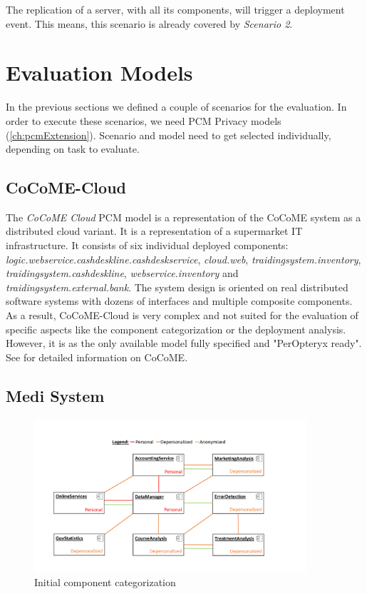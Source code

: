 The replication of a server, with all its components, will trigger a deployment event. This means, this scenario is already covered by \textit{Scenario 2}.


\section{Evaluation Models}
\label{sec:Evaluation:models}

In the previous sections we defined a couple of scenarios for the evaluation. In order to execute these scenarios, we need PCM Privacy models (\autoref{ch:pcmExtension}). Scenario and model need to get selected individually, depending on task to evaluate.

\subsection{CoCoME-Cloud}
\label{sec:eval:models:cocome}

The \textit{CoCoME Cloud} PCM model is a representation of the CoCoME system as a distributed cloud variant. It is a representation of a supermarket IT infrastructure. It consists of six individual deployed components:  \textit{logic.webservice.cashdeskline.cashdeskservice}, \textit{cloud.web}, \textit{traidingsystem.inventory}, \textit{traidingsystem.cashdeskline}, \textit{webservice.inventory} and \textit{traidingsystem.external.bank}. The system design is oriented on real distributed software systems with dozens of interfaces and multiple composite components. As a result, CoCoME-Cloud is very complex and not suited for the evaluation of specific aspects like the component categorization or the deployment analysis. However, it is as the only available model fully specified and "PerOpteryx ready". See \cite{Heinrich.2015} for detailed information on CoCoME.


\subsection{Medi System}
\label{sec:eval:models:medSys}

\begin{figure}[h]
	\centering
	\includegraphics[trim = 0mm 10mm 0mm 20mm, clip, width=0.90\textwidth]{graphs/medSystem_noserver}
	\caption{Initial component categorization}
	\label{fig:model:medi}
\end{figure}

